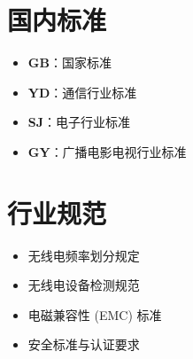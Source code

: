 \section{国内标准}

\begin{itemize}
    \item \textbf{GB}：国家标准
    \item \textbf{YD}：通信行业标准
    \item \textbf{SJ}：电子行业标准
    \item \textbf{GY}：广播电影电视行业标准
\end{itemize}

\section{行业规范}

\begin{itemize}
    \item 无线电频率划分规定
    \item 无线电设备检测规范
    \item 电磁兼容性 (EMC) 标准
    \item 安全标准与认证要求
\end{itemize}